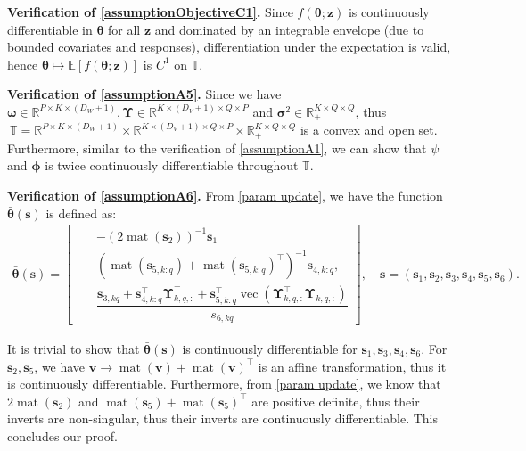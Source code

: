 \documentclass{article}
\DeclareMathOperator*{\vect}{vec} %
\DeclareMathOperator*{\mat}{mat}
\def\phib        {{\sbmm{\phi}}\XS}        \def\Phib       {{\sbmm{\Phi}}\XS}
\def\XS{\xspace}
\def\sbmm#1{\ensuremath{\boldsymbol{#1}}}
\def\rvz{{\mathbf{z}}}
\def\vsigma{{\bm{\sigma}}}
\def\vomega{{\bm{\omega}}}
\def\vtheta{{\bm{\theta}}}
\def\vs{{\bm{s}}}
\def\vv{{\bm{v}}}
\def\vz{{\bm{z}}}
\def\mUpsilon{{\bm{\Upsilon}}}
\def\sR{{\mathbb{R}}}
\def\sT{{\mathbb{T}}}
\newcommand{\E}{\mathbb{E}}
\begin{document}
\textbf{Verification of \cref{assumptionObjectiveC1}.} Since $f(\vtheta;\vz)$ is continuously differentiable in $\vtheta$ for all $\vz$
and dominated by an integrable envelope (due to bounded covariates and responses),
differentiation under the expectation is valid, hence
$\vtheta \mapsto \E[f(\vtheta;\rvz)]$ is $C^1$ on $\sT$.


\textbf{Verification of \cref{assumptionA5}.} Since we have $\vomega \in \sR^{P\times K\times (D_W+1)},\mUpsilon\in \sR^{K\times (D_V+1)\times Q\times P}$ and $\vsigma^2 \in \sR_{+}^{K\times Q\times Q}$, thus $~\mathbb{T}=\sR^{P\times K\times (D_W+1)}\times \sR^{K\times (D_V+1)\times Q\times P}\times\sR_{+}^{K\times Q\times Q}$ is a convex and open set. Furthermore, similar to the verification of \cref{assumptionA1}, we can show that $\psi$ and $\phib$ is twice continuously differentiable throughout $\mathbb{T}$.

\textbf{Verification of \cref{assumptionA6}.} From \cref{param update}, we have the function $\bar{\vtheta}(\vs)$ is defined as:
\begin{align*}
    \bar{\vtheta}(\vs)=\begin{bmatrix}
      &-\left(2\mat(\vs_{2}) \right)^{-1} \vs_{1}\\
      -&\left(\mat\left(\vs_{5,k:q}\right)+\mat\left(\vs_{5,k:q}\right)^{\top}\right)^{-1}\vs_{4,k:q},\\
      &\dfrac{\vs_{3,kq}+\vs_{4,k:q}^{\top}\mUpsilon_{k,q,:}^{\top}+\vs_{5,k:q}^{\top}\vect(\mUpsilon_{k,q,:}^{\top}\mUpsilon_{k,q,:})}{s_{6,kq}}
    \end{bmatrix}, \quad \vs=(\vs_1,\vs_2,\vs_3,\vs_4,\vs_5,\vs_6).
\end{align*}
\par It is trivial to show that $\bar{\vtheta}(\vs)$ is continuously differentiable for $\vs_1, \vs_3, \vs_4, \vs_6$. For $\vs_2, \vs_5$, we have $\vv\rightarrow \mat(\vv)+\mat(\vv)^{\top}$ is an affine transformation, thus it is continuously differentiable. Furthermore, from \cref{param update}, we know that $2\mat(\vs_2)$ and $\mat(\vs_5)+\mat(\vs_5)^{\top}$ are positive definite, thus their inverts are non-singular, thus their inverts are continuously differentiable. This concludes our proof.
\end{document}
